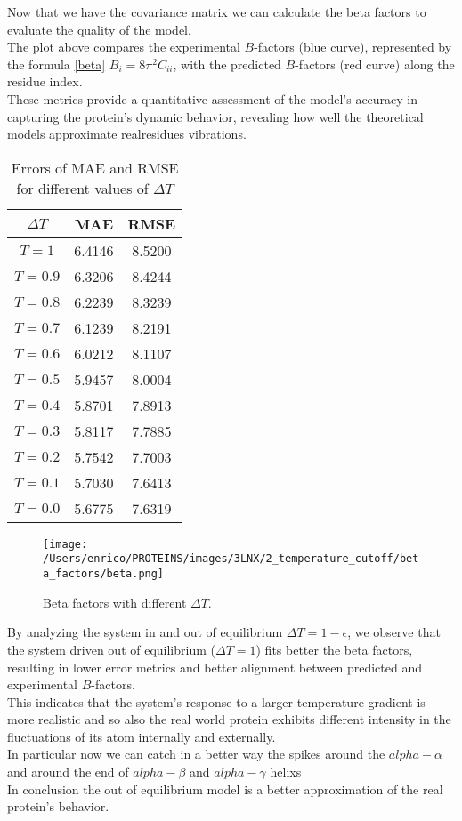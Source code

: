 \documentclass[English, Lau, oneside]{sapthesis}
\begin{document}
\newpage
Now that we have the covariance matrix we can calculate the beta factors to evaluate the quality of the model.\\
The plot above compares the experimental \( B \)-factors (blue curve), represented by the formula \eqref{beta} $B_i = 8\pi^2 C_{ii}$, with the predicted \( B \)-factors (red curve) along the residue index. \\
These metrics provide a quantitative assessment of the model's accuracy in capturing the protein's dynamic behavior, revealing how well the theoretical models approximate realresidues vibrations.
\begin{table}[ht]
    \centering
    \begin{tabular}{|c|c|c|}
        \hline
        $\Delta T$ & MAE & RMSE \\ \hline
        $T=1$ & 6.4146 &  8.5200 \\ \hline
        $T=0.9$ & 6.3206 &  8.4244 \\ \hline
        $T=0.8$ & 6.2239 &  8.3239 \\ \hline
        $T=0.7$ & 6.1239 &  8.2191 \\ \hline
        $T=0.6$ & 6.0212 &  8.1107 \\ \hline
        $T=0.5$ & 5.9457 &  8.0004 \\ \hline
        $T=0.4$ & 5.8701 &  7.8913 \\ \hline
        $T=0.3$ & 5.8117 &  7.7885 \\ \hline
        $T=0.2$ & 5.7542 &  7.7003 \\ \hline
        $T=0.1$ & 5.7030 &  7.6413 \\ \hline
        $T=0.0$ & 5.6775 &  7.6319 \\ \hline
    \end{tabular}
    \caption{Errors of MAE and RMSE for different values of $\Delta T$}
    \label{tab:mae_rmse}
\end{table}

\begin{figure}[h!]
    \centering
    \texttt{[image: /Users/enrico/PROTEINS/images/3LNX/2\_temperature\_cutoff/beta\_factors/beta.png]}
    \caption{Beta factors with different $\Delta T$.}
\end{figure}
By analyzing the system in and out of equilibrium \(\Delta T = 1 - \epsilon \), we observe that the system driven out of equilibrium (\(\Delta T = 1\)) fits better the beta factors, resulting in lower error metrics and better alignment between predicted and experimental \( B \)-factors. \\
This indicates that the system's response to a larger temperature gradient is more realistic and so also the real world protein exhibits different intensity in the fluctuations of its atom internally and externally.\\
In particular now we can catch in a better way the spikes around the $alpha-\alpha$ and around the end of $alpha-\beta$ and  $alpha-\gamma$ helixs\\
In conclusion the out of equilibrium model is a better approximation of the real protein's behavior.\\
\end{document}
